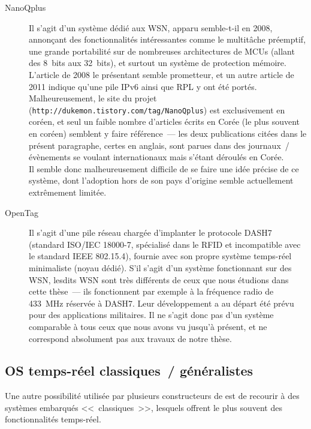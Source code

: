 \begin{description}
\item[NanoQplus] \cite{NanoQplus2008}
Il s'agit d'un système dédié aux WSN, apparu semble-t-il en 2008,
annonçant des fonctionnalités intéressantes comme le multitâche
préemptif, une grande portabilité sur de nombreuses architectures de MCUs
(allant des 8~bits aux 32~bits), et surtout un système de protection mémoire.
L'article de 2008 le présentant \cite{NanoQplus2008} semble prometteur, et
un autre article de 2011 \cite{NanoQplusIPv6RPL2011} indique qu'une pile
IPv6 ainsi que RPL y ont été portés.\\
Malheureusement, le site du projet
(\texttt{http://dukemon.tistory.com/tag/NanoQplus}) est exclusivement
en coréen, et seul un faible nombre d'articles écrits en Corée (le plus
souvent en coréen) semblent y faire référence~--- les deux publications
citées dans le présent paragraphe, certes en anglais, sont parues dans
des journaux~/ évènements se voulant internationaux mais s'étant déroulés
en Corée.\\
Il semble donc malheureusement difficile de se faire une idée précise
de ce système, dont l'adoption hors de son pays d'origine semble
actuellement extrêmement limitée.

\item[OpenTag]
Il s'agit d'une pile réseau chargée d'implanter le protocole
DASH7 (standard ISO/IEC 18000-7, spécialisé dans le RFID et incompatible
avec le standard IEEE 802.15.4), fournie avec son propre système
temps-réel minimaliste (noyau dédié). S'il s'agit 
d'un système fonctionnant sur des WSN, lesdits WSN sont très différents
de ceux que nous étudions dans cette thèse~--- ils fonctionnent par
exemple à la fréquence radio de 433~MHz réservée à DASH7. Leur
développement a au départ été prévu pour des applications militaires.
Il ne s'agit donc pas d'un système comparable à tous ceux que nous
avons vu jusqu'à présent, et ne correspond absolument pas aux travaux
de notre thèse.

\end{description}


\subsection{OS temps-réel classiques~/ généralistes}
\label{SubsecOSTempsReel}

Une autre possibilité utilisée par plusieurs constructeurs de
 est de recourir à des systèmes embarqués <<~classiques~>>,
lesquels offrent le plus souvent des fonctionnalités temps-réel.

